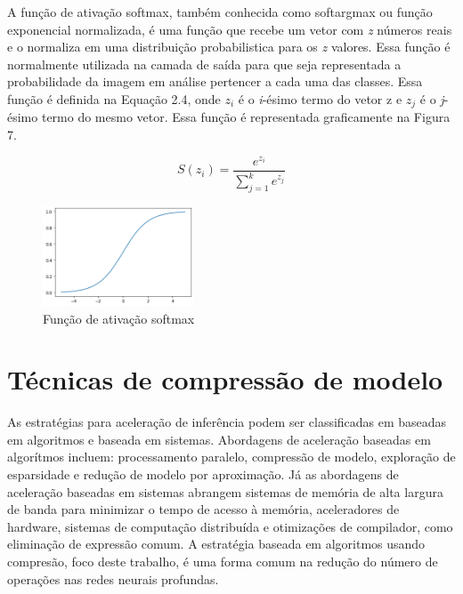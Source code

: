 A função de ativação softmax, também conhecida como softargmax ou função exponencial normalizada, é uma função que recebe um vetor com \textit{z} números reais e o normaliza em uma distribuição probabilistica para os \textit{z} valores. Essa função é normalmente utilizada na camada de saída para que seja representada a probabilidade da imagem em análise pertencer a cada uma das classes. Essa função é definida na Equação 2.4, onde $z_i$ é o \textit{i}-ésimo termo do vetor z e $z_j$ é o \textit{j}-ésimo termo do mesmo vetor. Essa função é representada graficamente na Figura 7.

\begin{equation}
    S(z_i) = \frac{e^{z_i}}{\sum_{j=1}^k e^{z_j}}
\end{equation}

\begin{figure}[H]
	\includegraphics[width=0.4\textwidth, keepaspectratio=true]{figuras/softmax.png}
	\centering
	\caption[Função de ativação softmax]{Função de ativação softmax}
\end{figure}

\section{Técnicas de compressão de modelo} \label{secao1}
As estratégias para aceleração de inferência podem ser classificadas em baseadas em algoritmos e baseada em sistemas. Abordagens de aceleração baseadas em algorítmos incluem: processamento paralelo, compressão de modelo, exploração de esparsidade e redução de modelo por aproximação. Já as abordagens de aceleração baseadas em sistemas abrangem sistemas de memória de alta largura de banda para minimizar o tempo de acesso à memória, aceleradores de hardware, sistemas de computação distribuída e otimizações de compilador, como eliminação de expressão comum. A estratégia baseada em algoritmos usando compresão, foco deste trabalho, é uma forma comum na redução do número de operações nas redes neurais profundas.


